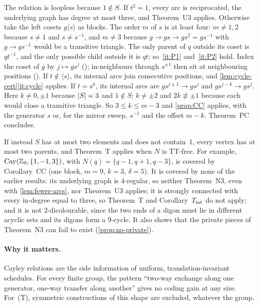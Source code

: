 \begin{outline}
The relation is loopless because $1\notin S$. If $t^2=1$, every arc is reciprocated, the underlying graph has degree at
most three, and Theorem~U3 applies. Otherwise take the left cosets $g\langle s\rangle$ as blocks. The order $m$ of $s$ is at least four: $m\ne1,2$ because $s\ne1$ and $s\ne s^{-1}$, and $m\ne3$
because $g\to gs\to gs^2=gs^{-1}$ with $g\to gs^{-1}$ would be a transitive triangle. The only parent of $q$ outside its
coset is $qt^{-1}$, and the only possible child outside it is $qt$; so~\ref{it:P1} and~\ref{it:P2} hold. Index the coset of
$g$ by $j\mapsto gs^j$ (); in-neighbours through $s^{\pm1}$ then sit at neighbouring positions
(). If $t\notin\langle s\rangle$, its internal arcs join consecutive positions,
and \cref{lem:cycle-cert}\ref{it:cycle} applies. If $t=s^k$, its internal arcs are $gs^{j\pm1}\to gs^j$ and
$gs^{j-k}\to gs^j$. Here $k\ne0,\pm1$ because $\lvert S \rvert=3$ and $1\notin S$; $k\ne\pm2$ and $2k\not\equiv\pm1$ because
each would close a transitive triangle. So $3\le k\le m-3$ and \cref{prop:CC} applies, with the generator $s$ or, for the
mirror sweep, $s^{-1}$ and the offset $m-k$. Theorem~PC concludes.
\end{outline}

If instead $S$ has at most two elements and does not contain~$1$, every vertex has at most two parents, and Theorem~T
applies when $N$ is TT-free. For example,
$\operatorname{Cay}(\mathbb{Z}_9,\{1,-1,3\})$, with $N(q)=\{q-1,q+1,q-3\}$, is covered by Corollary~CC (one block, $m=9$,
$k=3$, $\delta=5$). It is covered by none of the earlier results: its underlying graph is $4$-regular, so neither
Theorem~N3, even with \cref{lem:fewer-arcs}, nor Theorem~U3 applies; it is strongly connected with every in-degree equal
to three, so Theorem~T and Corollary~$T_{\mathrm{int}}$ do not apply; and it is not $2$-dicolourable, since the two ends of a
digon must lie in different acyclic sets and its digons form a $9$-cycle. It also shows that the private pieces of Theorem~N3 can fail to exist (\cref{prop:no-private}).

\paragraph{Why it matters.} Cayley relations are the side information of uniform, translation-invariant schedules. For
every finite group, the pattern ``two-way exchange along one generator, one-way transfer along another'' gives no
coding gain at any size. For~(T), symmetric constructions of this shape are excluded, whatever the group.
